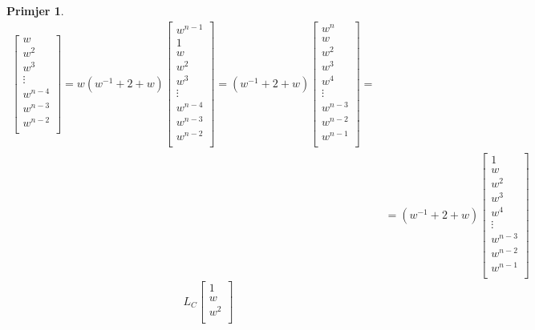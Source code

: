 \documentclass[11pt]{article}
\newtheorem{example}{Primjer}
\begin{document}
\begin{example}
\[\begin{split}
\begin{bmatrix}
		w        \\
		w^2      \\
		w^3      \\
		\vdots   \\
		w^{n-4}  \\
		w^{n-3}  \\
		w^{n-2}  \\
		\end{bmatrix}
		= 
		w (w^{-1} + 2 + w)
		\begin{bmatrix}
		w^{n-1}  \\
		1        \\
		w        \\
		w^2      \\
		w^3      \\
		\vdots   \\
		w^{n-4}  \\
		w^{n-3}  \\
		w^{n-2}  \\
		\end{bmatrix}
		= 
		(w^{-1} + 2 + w)
		\begin{bmatrix}
		w^n      \\
		w        \\
		w^2      \\
		w^3      \\
		w^4      \\
		\vdots   \\
		w^{n-3}  \\
		w^{n-2}  \\
		w^{n-1}  \\
		\end{bmatrix} = \\
		& = 
		(w^{-1} + 2 + w)
		\begin{bmatrix}
		1      \\
		w        \\
		w^2      \\
		w^3      \\
		w^4      \\
		\vdots   \\
		w^{n-3}  \\
		w^{n-2}  \\
		w^{n-1}  \\
		\end{bmatrix}
	\end{split}
	\]
	\[
	 L_C 
	 \begin{bmatrix}
		1      \\
		w        \\
		w^2      \\

\end{bmatrix}\]
\end{example}
\end{document}
